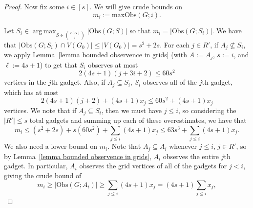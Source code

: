 \documentclass[10pt,a4paper]{amsart}
\DeclareMathOperator*{\argmax}{arg\,max}
\begin{document}
\begin{proof}
            Now fix some $i\in [s]$.
            We will give crude bounds on
                \[ m_i:=\mathrm{maxObs}(G;i). \]
            
            Let $\displaystyle S_i\in \argmax_{S\in\binom{V(G)}{i}} |\mathrm{Obs}(G;S)|$ so that $m_i=|\mathrm{Obs}(G;S_i)|$.
            We have that $|\mathrm{Obs}(G;S_i)\cap V(G_0)|\leq |V(G_0)|=s^2+2s$.
            For each $j\in R'$, if $A_j\not\subseteq S_i$, we apply Lemma~\ref{lemma bounded observence in grids} (with $A:=A_j$, $s:=i$, and $\ell:=4s+1$) to get that $S_i$ observes at most
                \[ 
                2(4s+1)(j+3i+2)\leq 60s^2 
                \]
            vertices in the $j$th gadget.
            Also, if $A_j\subseteq S_i$, $S_i$ observes all of the $j$th gadget, which has at most
                \[ 
                2(4s+1)(j+2)+(4s+1)x_j
                \leq 60s^2+(4s+1)x_j 
                \]
            vertices.
            We note that if $A_j\subseteq S_i$, then we must have $j\leq i$, so considering the $|R'|\leq s$ total gadgets and summing up each of these overestimates, we have that
            \begin{equation}\label{equation upper bound on m_i}
                m_i\leq (s^2+2s)+s(60s^2)+ \sum_{j\leq i} (4s+1)x_j\leq 63s^3+\sum_{j\leq i} (4s+1)x_j.
            \end{equation}
            We also need a lower bound on $m_i$.
            Note that $A_j\subseteq A_i$ whenever $j\leq i$, $j\in R'$, so by Lemma~\ref{lemma bounded observence in grids}, $A_i$ observes the entire $j$th gadget. In particular, $A_i$ observes the grid vertices of all of the gadgets for $j<i$, giving the crude bound of 
            \begin{equation}\label{equation lower bound on m_i}
                m_i\geq |\mathrm{Obs}(G;A_i)|\geq \sum_{j\leq i}(4s+1)x_j=(4s+1)\sum_{j\leq i}x_j,
            \end{equation}
            

\end{proof}
\end{document}
